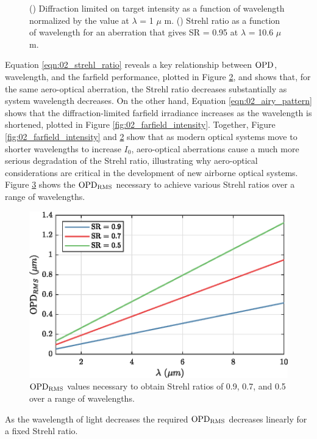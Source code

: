 \begin{figure}
\begin{subfigure}[t]{0.45\textwidth}
    \caption{}\label{fig:02_all_strehl_ratio}
  \end{subfigure}
  \caption{() Diffraction limited on target intensity as a function of wavelength normalized by the value at $\lambda$ = 1 $\mu$ m. () Strehl ratio as a function of wavelength for an aberration that gives SR = 0.95 at $\lambda$ = 10.6 $\mu$m.}
\end{figure}
Equation \ref{eqn:02_strehl_ratio} reveals a key relationship between $\operatorname{OPD}$, wavelength, and the farfield performance, plotted in Figure \ref{fig:02_all_strehl_ratio}, and shows that, for the same aero-optical aberration, the Strehl ratio decreases substantially as system wavelength decreases.
On the other hand, Equation \ref{eqn:02_airy_pattern} shows that the diffraction-limited farfield irradiance increases as the wavelength is shortened, plotted in Figure \ref{fig:02_farfield_intensity}.
Together, Figure \ref{fig:02_farfield_intensity} and \ref{fig:02_all_strehl_ratio} show that as modern optical systems move to shorter wavelengths to increase $I_0$, aero-optical aberrations cause a much more serious degradation of the Strehl ratio, illustrating why aero-optical considerations are critical in the development of new airborne optical systems.
Figure \ref{fig:02_necessary_opd} shows the $\operatorname{OPD_{RMS}}$ necessary to achieve various Strehl ratios over a range of wavelengths.
\begin{figure}
  \centering
  \includegraphics{../matlab/02_background/necessary_opd.eps}
  \caption{$\operatorname{OPD_{RMS}}$ values necessary to obtain Strehl ratios of 0.9, 0.7, and 0.5 over a range of wavelengths.}
  \label{fig:02_necessary_opd}
\end{figure}
As the wavelength of light decreases the required $\operatorname{OPD_{RMS}}$ decreases linearly for a fixed Strehl ratio.


